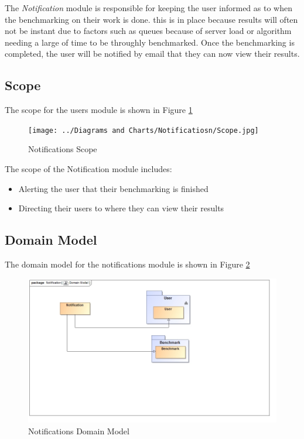 The \textit{Notification} module is responsible for keeping the user informed 
as to when the benchmarking on their work is done. this is in place because
results will often not be instant due to factors such as queues because of server
load or algorithm needing a large of time to be throughly benchmarked. Once the
benchmarking is completed, the user will be notified by email that they can now
view their results.

\subsection{Scope}
The scope for the users module is shown in Figure \ref{Notifications Scope}
\begin{figure}[H]
	\begin{center}
		\texttt{[image: ../Diagrams and Charts/Notificatiosn/Scope.jpg]}
		\caption{Notifications Scope}
	\end{center}
	\label{Notifications Scope}
\end{figure}
The scope of the Notification module includes:
\begin{itemize}
	\item Alerting the user that their benchmarking is finished
	\item Directing their users to where they can view their results
\end{itemize}

\subsection{Domain Model}
The domain model for the notifications module is shown in Figure \ref{Notifications Domain Model}
\begin{figure}[H]
	\begin{center}
		\includegraphics[scale=1.0]{../Diagrams and Charts/Notifications/Domain Model.jpg}  
		\caption{Notifications Domain Model}
	\end{center}
	\label{Notifications Domain Model}
\end{figure}